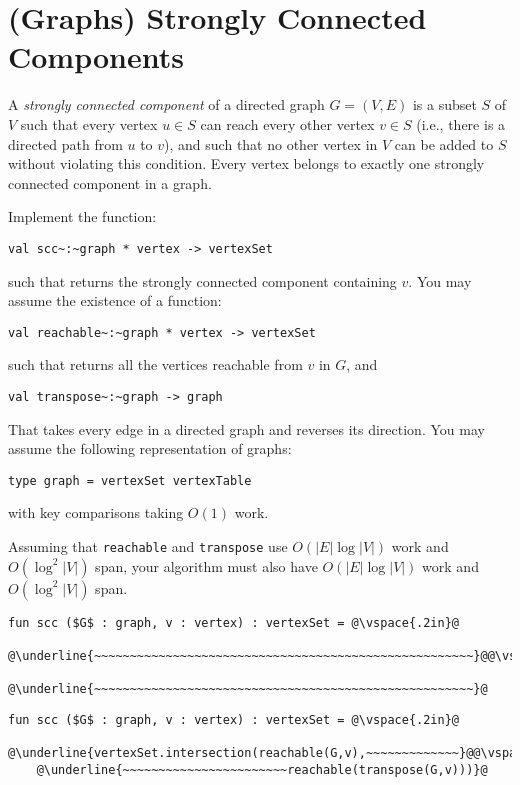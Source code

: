 \section{(Graphs) Strongly Connected Components}

%

A \emph{strongly connected component} of a directed graph $G = (V,E)$ is a subset $S$ of $V$ such
that every vertex $u \in S$ can reach every other vertex $v \in S$ (i.e.,
there is a directed path from $u$ to $v$), and such that no other vertex in
$V$ can be added to $S$ without violating this condition. Every vertex
belongs to exactly one strongly connected component in a graph.

\begin{problem}[10.]
\ask
Implement the function:
\begin{lstlisting}
val scc~:~graph * vertex -> vertexSet
\end{lstlisting}
such that  returns the strongly connected component containing $v$. You may assume
the existence of a function:
\begin{lstlisting}
val reachable~:~graph * vertex -> vertexSet
\end{lstlisting}
such that  returns all the vertices reachable from $v$
in $G$, and 
\begin{lstlisting}
val transpose~:~graph -> graph
\end{lstlisting}
That takes every edge in a directed graph and reverses its direction.
You may assume the following representation of graphs:
\begin{lstlisting}
type graph = vertexSet vertexTable
\end{lstlisting}
with key comparisons taking $O(1)$ work.

Assuming that \texttt{reachable} and \texttt{transpose} use
$O(|E|\log|V|)$ work and $O(\log^2 |V|)$ span, your algorithm
must also have $O(|E|\log|V|)$ work and $O(\log^2 |V|)$ span.

\begin{lstlisting}[numbers=none]
fun scc ($G$ : graph, v : vertex) : vertexSet = @\vspace{.2in}@
      @\underline{~~~~~~~~~~~~~~~~~~~~~~~~~~~~~~~~~~~~~~~~~~~~~~~~~~~~~}@@\vspace{.2in}@
      @\underline{~~~~~~~~~~~~~~~~~~~~~~~~~~~~~~~~~~~~~~~~~~~~~~~~~~~~~}@
\end{lstlisting}


\sol
\begin{lstlisting}[numbers=none]
fun scc ($G$ : graph, v : vertex) : vertexSet = @\vspace{.2in}@
    @\underline{vertexSet.intersection(reachable(G,v),~~~~~~~~~~~~~}@@\vspace{.2in}@
    @\underline{~~~~~~~~~~~~~~~~~~~~~~~reachable(transpose(G,v)))}@
\end{lstlisting}

\end{problem}

